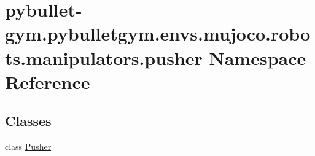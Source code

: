 \hypertarget{namespacepybullet-gym_1_1pybulletgym_1_1envs_1_1mujoco_1_1robots_1_1manipulators_1_1pusher}{}\section{pybullet-\/gym.pybulletgym.\+envs.\+mujoco.\+robots.\+manipulators.\+pusher Namespace Reference}
\label{namespacepybullet-gym_1_1pybulletgym_1_1envs_1_1mujoco_1_1robots_1_1manipulators_1_1pusher}
\subsection*{Classes}
\begin{DoxyCompactItemize}
\item 
class \hyperlink{classpybullet-gym_1_1pybulletgym_1_1envs_1_1mujoco_1_1robots_1_1manipulators_1_1pusher_1_1_pusher}{Pusher}
\end{DoxyCompactItemize}

